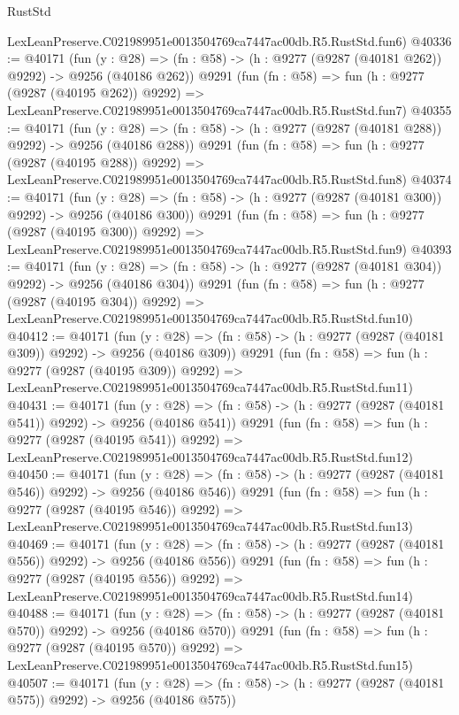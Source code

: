 \begin{lexlean}{RustStd}
\begin{coremodule}
    LexLeanPreserve.C021989951e0013504769ca7447ac00db.R5.RustStd.fun6)
@40336 := @40171
    (fun (y : @28) => (fn : @58) -> (h : @9277 (@9287 (@40181 @262)) @9292) -> @9256 (@40186 @262))
    @9291
    (fun (fn : @58) =>
    fun (h : @9277 (@9287 (@40195 @262)) @9292) =>
    LexLeanPreserve.C021989951e0013504769ca7447ac00db.R5.RustStd.fun7)
@40355 := @40171
    (fun (y : @28) => (fn : @58) -> (h : @9277 (@9287 (@40181 @288)) @9292) -> @9256 (@40186 @288))
    @9291
    (fun (fn : @58) =>
    fun (h : @9277 (@9287 (@40195 @288)) @9292) =>
    LexLeanPreserve.C021989951e0013504769ca7447ac00db.R5.RustStd.fun8)
@40374 := @40171
    (fun (y : @28) => (fn : @58) -> (h : @9277 (@9287 (@40181 @300)) @9292) -> @9256 (@40186 @300))
    @9291
    (fun (fn : @58) =>
    fun (h : @9277 (@9287 (@40195 @300)) @9292) =>
    LexLeanPreserve.C021989951e0013504769ca7447ac00db.R5.RustStd.fun9)
@40393 := @40171
    (fun (y : @28) => (fn : @58) -> (h : @9277 (@9287 (@40181 @304)) @9292) -> @9256 (@40186 @304))
    @9291
    (fun (fn : @58) =>
    fun (h : @9277 (@9287 (@40195 @304)) @9292) =>
    LexLeanPreserve.C021989951e0013504769ca7447ac00db.R5.RustStd.fun10)
@40412 := @40171
    (fun (y : @28) => (fn : @58) -> (h : @9277 (@9287 (@40181 @309)) @9292) -> @9256 (@40186 @309))
    @9291
    (fun (fn : @58) =>
    fun (h : @9277 (@9287 (@40195 @309)) @9292) =>
    LexLeanPreserve.C021989951e0013504769ca7447ac00db.R5.RustStd.fun11)
@40431 := @40171
    (fun (y : @28) => (fn : @58) -> (h : @9277 (@9287 (@40181 @541)) @9292) -> @9256 (@40186 @541))
    @9291
    (fun (fn : @58) =>
    fun (h : @9277 (@9287 (@40195 @541)) @9292) =>
    LexLeanPreserve.C021989951e0013504769ca7447ac00db.R5.RustStd.fun12)
@40450 := @40171
    (fun (y : @28) => (fn : @58) -> (h : @9277 (@9287 (@40181 @546)) @9292) -> @9256 (@40186 @546))
    @9291
    (fun (fn : @58) =>
    fun (h : @9277 (@9287 (@40195 @546)) @9292) =>
    LexLeanPreserve.C021989951e0013504769ca7447ac00db.R5.RustStd.fun13)
@40469 := @40171
    (fun (y : @28) => (fn : @58) -> (h : @9277 (@9287 (@40181 @556)) @9292) -> @9256 (@40186 @556))
    @9291
    (fun (fn : @58) =>
    fun (h : @9277 (@9287 (@40195 @556)) @9292) =>
    LexLeanPreserve.C021989951e0013504769ca7447ac00db.R5.RustStd.fun14)
@40488 := @40171
    (fun (y : @28) => (fn : @58) -> (h : @9277 (@9287 (@40181 @570)) @9292) -> @9256 (@40186 @570))
    @9291
    (fun (fn : @58) =>
    fun (h : @9277 (@9287 (@40195 @570)) @9292) =>
    LexLeanPreserve.C021989951e0013504769ca7447ac00db.R5.RustStd.fun15)
@40507 := @40171
    (fun (y : @28) => (fn : @58) -> (h : @9277 (@9287 (@40181 @575)) @9292) -> @9256 (@40186 @575))

\end{coremodule}
\end{lexlean}
